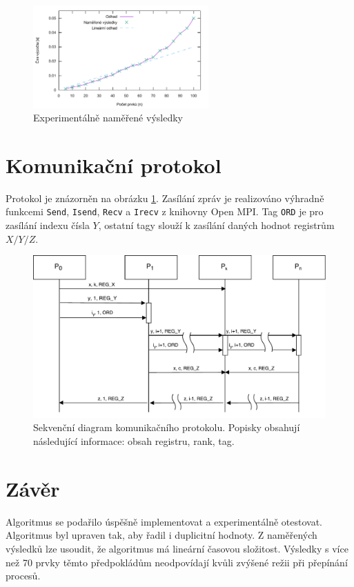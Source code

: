 \documentclass[11pt,a4paper]{article}
\begin{document}
\begin{figure}[!ht]
    \centering
		\includegraphics[width=0.6\textwidth]{results}
    \caption{Experimentálně naměřené výsledky}
\end{figure}

\section{Komunikační protokol}
\label{proto}

Protokol je znázorněn na obrázku \ref{proto_schema}. Zasílání zpráv je realizováno výhradně funkcemi \texttt{Send}, \texttt{Isend}, \texttt{Recv} a \texttt{Irecv} z knihovny Open MPI. Tag \texttt{ORD} je pro zasílání indexu čísla $Y$, ostatní tagy slouží k zasílání daných hodnot registrům $X/Y/Z$.

\begin{figure}[!h]
    \includegraphics[width=0.8\linewidth]{protokol}
    \centering
    \caption{Sekvenční diagram komunikačního protokolu. Popisky obsahují následující informace: obsah registru, rank, tag.}
    \label{proto_schema}
\end{figure}


\section{Závěr}

Algoritmus se podařilo úspěšně implementovat a experimentálně otestovat. Algoritmus byl upraven tak, aby řadil i duplicitní hodnoty. Z naměřených výsledků lze usoudit, že algoritmus má lineární časovou složitost. Výsledky s více než 70 prvky těmto předpokládům neodpovídají kvůli zvýšené režii při přepínání procesů.




\makeatletter
\makeatother

\end{document}
